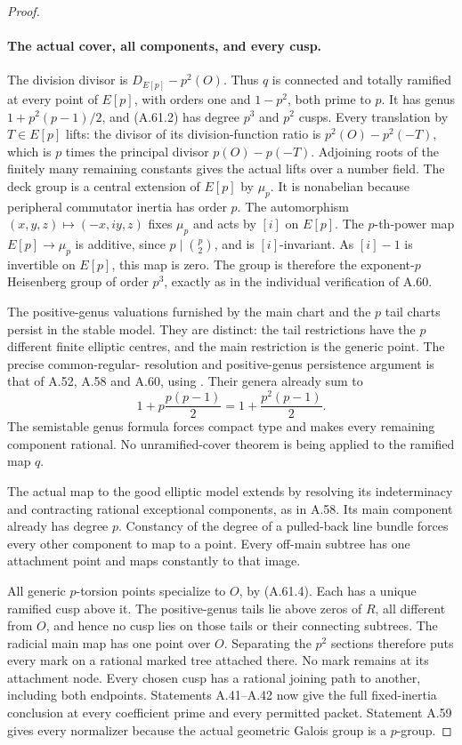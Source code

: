 \begin{proof}
\paragraph{The actual cover, all components, and every cusp.}
The division divisor is
\(D_{E[p]}-p^2(O)\). Thus \(q\) is connected
and totally ramified at every point of \(E[p]\),
with orders one and \(1-p^2\), both prime to
\(p\). It has genus \(1+p^2(p-1)/2\), and
(A.61.2) has degree \(p^3\) and \(p^2\) cusps.
Every translation by \(T\in E[p]\) lifts:
the divisor of its division-function ratio is
\(p^2(O)-p^2(-T)\), which is \(p\) times
the principal divisor \(p(O)-p(-T)\).
Adjoining roots of the finitely many remaining
constants gives the actual lifts over a number
field. The deck group is a central extension
of \(E[p]\) by \(\mu_p\). It is nonabelian
because peripheral commutator inertia has
order \(p\). The automorphism
\((x,y,z)\mapsto(-x,iy,z)\) fixes \(\mu_p\)
and acts by \([i]\) on \(E[p]\).
The \(p\)-th-power map \(E[p]\to\mu_p\)
is additive, since \(p\mid\binom p2\), and
is \([i]\)-invariant. As \([i]-1\) is
invertible on \(E[p]\), this map is zero.
The group is therefore the exponent-\(p\)
Heisenberg group of order \(p^3\), exactly as
in the individual verification of A.60.

The positive-genus valuations furnished by
the main chart and the \(p\) tail charts
persist in the stable model. They are distinct:
the tail restrictions have the \(p\) different
finite elliptic centres, and the main restriction
is the generic point. The precise common-regular-
resolution and positive-genus persistence argument
is that of A.52, A.58 and A.60, using
\cite[Theorem 9.2.2, Remark 9.2.6 and Theorem 9.3.21]
{fghLiu}. Their genera already sum to
\[
                     1+p\frac{p(p-1)}2
                        =1+\frac{p^2(p-1)}2.          \tag{A.61.27}
\]
The semistable genus formula forces compact
type and makes every remaining component
rational. No unramified-cover theorem is
being applied to the ramified map \(q\).

The actual map to the good elliptic model
extends by resolving its indeterminacy and
contracting rational exceptional components,
as in A.58. Its main component already has
degree \(p\). Constancy of the degree of a
pulled-back line bundle forces every other
component to map to a point. Every off-main
subtree has one attachment point and maps
constantly to that image.

All generic \(p\)-torsion points specialize
to \(O\), by (A.61.4). Each has a unique
ramified cusp above it. The positive-genus
tails lie above zeros of \(R\), all different
from \(O\), and hence no cusp lies on those
tails or their connecting subtrees. The
radicial main map has one point over \(O\).
Separating the \(p^2\) sections therefore
puts every mark on a rational marked tree
attached there. No mark remains at its
attachment node. Every chosen cusp has a
rational joining path to another, including
both endpoints. Statements A.41--A.42 now
give the full fixed-inertia conclusion at
every coefficient prime and every permitted
packet. Statement A.59 gives every normalizer
because the actual geometric Galois group
is a \(p\)-group.


\end{proof}
